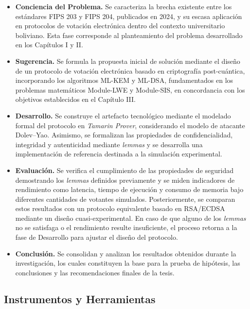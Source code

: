 \begin{itemize}
	\item \textbf{Conciencia del Problema.} Se caracteriza la brecha existente entre los estándares FIPS 203 y FIPS 204, publicados en 2024, y su escasa aplicación en protocolos de votación electrónica dentro del contexto universitario boliviano. Esta fase corresponde al planteamiento del problema desarrollado en los Capítulos I y II.
	
	\item \textbf{Sugerencia.} Se formula la propuesta inicial de solución mediante el diseño de un protocolo de votación electrónica basado en criptografía post-cuántica, incorporando los algoritmos ML-KEM y ML-DSA, fundamentados en los problemas matemáticos Module-LWE y Module-SIS, en concordancia con los objetivos establecidos en el Capítulo III.
	
	\item \textbf{Desarrollo.} Se construye el artefacto tecnológico mediante el modelado formal del protocolo en \textit{Tamarin Prover}, considerando el modelo de atacante Dolev--Yao. Asimismo, se formalizan las propiedades de confidencialidad, integridad y autenticidad mediante \textit{lemmas} y se desarrolla una implementación de referencia destinada a la simulación experimental.
	
	\item \textbf{Evaluación.} Se verifica el cumplimiento de las propiedades de seguridad demostrando los \textit{lemmas} definidos previamente y se miden indicadores de rendimiento como latencia, tiempo de ejecución y consumo de memoria bajo diferentes cantidades de votantes simulados. Posteriormente, se comparan estos resultados con un protocolo equivalente basado en RSA/ECDSA mediante un diseño cuasi-experimental. En caso de que alguno de los \textit{lemmas} no se satisfaga o el rendimiento resulte insuficiente, el proceso retorna a la fase de Desarrollo para ajustar el diseño del protocolo.
	
	\item \textbf{Conclusión.} Se consolidan y analizan los resultados obtenidos durante la investigación, los cuales constituyen la base para la prueba de hipótesis, las conclusiones y las recomendaciones finales de la tesis.
\end{itemize}

\subsection{Instrumentos y Herramientas}

